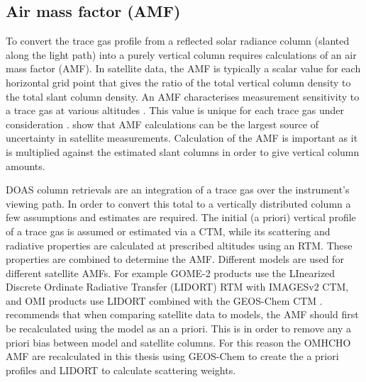   \subsection{Air mass factor (AMF)}
  \label{Model:omhcho:amf}
    To convert the trace gas profile from a reflected solar radiance column (slanted along the light path) into a purely vertical column requires calculations of an air mass factor (AMF).
    In satellite data, the AMF is typically a scalar value for each horizontal grid point that gives the ratio of the total vertical column density to the total slant column density.
    An AMF characterises measurement sensitivity to a trace gas at various altitudes \parencite{Palmer2001}.
    This value %
    is unique for each trace gas under consideration \parencite{Palmer2001,Millet2006}.
    \textcite{Lorente2017} show that AMF calculations can be the largest source of uncertainty in satellite measurements.
    Calculation of the AMF is important as it is multiplied against the estimated slant columns in order to give vertical column amounts.
    
    DOAS column retrievals are an integration of a trace gas over the instrument's viewing path.
    In order to convert this total to a vertically distributed column a few assumptions and estimates are required. 
    The initial (a priori) vertical profile of a trace gas is assumed or estimated via a CTM, while its scattering and radiative properties are calculated at prescribed altitudes using an RTM. 
    These properties are combined to determine the AMF.
    Different models are used for different satellite AMFs.
    For example GOME-2 products %
    use the LInearized Discrete Ordinate Radiative Transfer (LIDORT) RTM with IMAGESv2 CTM, and OMI products use LIDORT combined with the GEOS-Chem CTM \parencite{Chance2002, Abad2015}.
    \textcite{Lamsal2014} recommends that when comparing satellite data to models, the AMF should first be recalculated using the model as an a priori.
    This is in order to remove any a priori bias between model and satellite columns.
    For this reason the OMHCHO AMF are recalculated in this thesis using GEOS-Chem to create the a priori profiles and LIDORT to calculate scattering weights.
    
